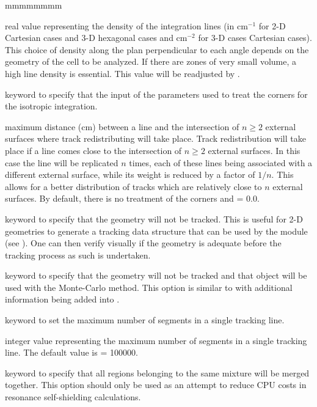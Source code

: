 \begin{ListeDeDescription}{mmmmmmmm}
\item[\dusa{dens}] real value representing the density of the integration lines (in cm$^{-1}$ for 2-D Cartesian cases and 
3-D hexagonal cases and cm$^{-2}$ for 3-D cases Cartesian cases). This choice of density along the 
plan perpendicular to each angle depends on the geometry of the cell to be analyzed. If there 
are zones of very small volume, a high line density is essential. This value will be readjusted by 
.

\item[\moc{CORN}] keyword to specify that the input of the parameters used to treat the corners for the isotropic 
integration. 

\item[\dusa{pcorn}] maximum distance (cm) between a line and the intersection of $n\ge 2$ external surfaces where 
track redistributing will take place. Track redistribution will take place if a line comes close to 
the intersection of $n \ge 2$ external surfaces. In this case the line will be replicated $n$ times, each 
of these lines being associated with a different external surface, while its weight is reduced by 
a factor of $1/n$. This allows for a better distribution of tracks which are relatively close to $n$ 
external surfaces. By default, there is no treatment of the corners and  = 0.0.

\item[\moc{NOTR}] keyword to specify that the geometry will not be tracked. This is useful for 2-D geometries 
to generate a tracking data structure that can be used by the  module (see ). 
One can then verify visually if the geometry is adequate before the tracking process as such is 
undertaken.

\item[\moc{MC}] keyword to specify that the geometry will not be tracked and that object  will be used with the
Monte-Carlo method. This option is similar to  with additional information being added into .

\item[\moc{NBSLIN}] keyword to set the maximum number of segments in a single tracking line.

\item[\dusa{nbsl}] integer value representing the maximum number of segments in a single tracking line. The default value is  = 100000.

\item[\moc{MERGMIX}] keyword to specify that all regions belonging to the same mixture will be merged together. This option should only be used as an attempt to reduce CPU costs in resonance self-shielding calculations.


\end{ListeDeDescription}
